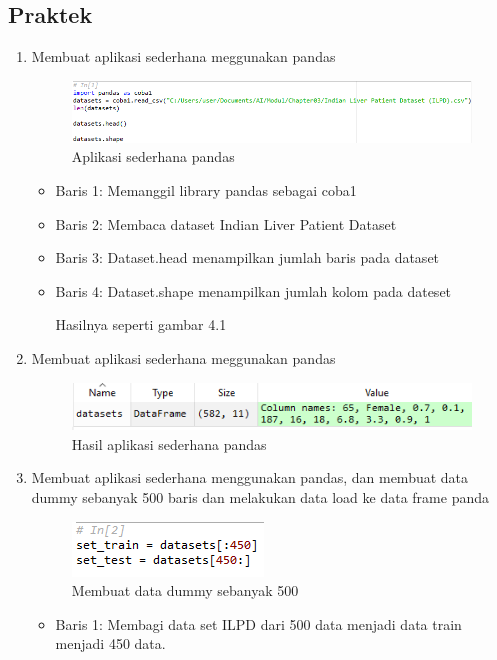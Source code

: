 \subsection{Praktek}
\begin{enumerate}
\item Membuat aplikasi sederhana meggunakan pandas
\begin{figure}[ht]
\centering
\includegraphics[scale=0.7]{figures/pandas/4_1.png}
\caption{Aplikasi sederhana pandas}
\end{figure}
\begin{itemize}
\item Baris 1: Memanggil library pandas sebagai coba1
\item Baris 2: Membaca dataset Indian Liver Patient Dataset
\item Baris 3: Dataset.head menampilkan jumlah baris pada dataset
\item Baris 4: Dataset.shape menampilkan jumlah kolom pada dateset
\par Hasilnya seperti gambar 4.1
\end{itemize}
\item Membuat aplikasi sederhana meggunakan pandas
\begin{figure}[ht]
\centering
\includegraphics[scale=0.9]{figures/pandas/4_2.png}
\caption{Hasil aplikasi sederhana pandas}
\end{figure}
\item Membuat aplikasi sederhana menggunakan pandas, dan membuat data dummy sebanyak 500 baris dan melakukan data load ke data frame panda
\begin{figure}[ht]
\centering
\includegraphics[scale=0.9]{figures/pandas/4_3.png}
\caption{Membuat data dummy sebanyak 500}
\end{figure}
\begin{itemize}
\item Baris 1: Membagi data set ILPD dari 500 data menjadi data train menjadi 450 data.

\end{itemize}
\end{enumerate}
